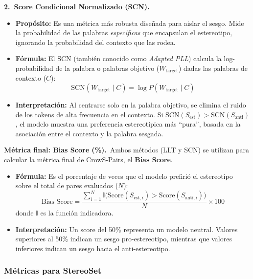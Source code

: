 \documentclass[12pt,a4paper]{report}
\begin{document}
\noindent\textbf{2.\ Score Condicional Normalizado (SCN).}
\begin{itemize}
    \item \textbf{Propósito:} Es una métrica más robusta diseñada para aislar el sesgo. Mide la probabilidad de las palabras \textit{específicas} que encapsulan el estereotipo, ignorando la probabilidad del contexto que las rodea.
    \item \textbf{Fórmula:} El SCN (también conocido como \textit{Adapted PLL}) calcula la log-probabilidad de la palabra o palabras objetivo ($W_{\text{target}}$) dadas las palabras de contexto ($C$):
    \begin{equation}
        \text{SCN}(W_{\text{target}} \mid C) = \log P(W_{\text{target}} \mid C)
    \end{equation}
    \item \textbf{Interpretación:} Al centrarse solo en la palabra objetivo, se elimina el ruido de los tokens de alta frecuencia en el contexto. Si $\text{SCN}(S_{\text{est}}) > \text{SCN}(S_{\text{anti}})$, el modelo muestra una preferencia estereotípica más ``pura'', basada en la asociación entre el contexto y la palabra sesgada.
\end{itemize}

\noindent\textbf{Métrica final: Bias Score (\%).}\ 
Ambos métodos (LLT y SCN) se utilizan para calcular la métrica final de CrowS-Pairs, el \textbf{Bias Score}.
\begin{itemize}
    \item \textbf{Fórmula:} Es el porcentaje de veces que el modelo prefirió el estereotipo sobre el total de pares evaluados ($N$):
    \begin{equation}
        \text{Bias Score} = \frac{\sum_{i=1}^{N} \mathbb{I}\bigl(\text{Score}(S_{\text{est}, i}) > \text{Score}(S_{\text{anti}, i})\bigr)}{N} \times 100
    \end{equation}
    donde $\mathbb{I}$ es la función indicadora.
    \item \textbf{Interpretación:} Un score del 50\% representa un modelo neutral. Valores superiores al 50\% indican un sesgo pro-estereotipo, mientras que valores inferiores indican un sesgo hacia el anti-estereotipo.
\end{itemize}

\subsubsection{Métricas para StereoSet}
\label{subsec:metricas_stereoset}
\end{document}
